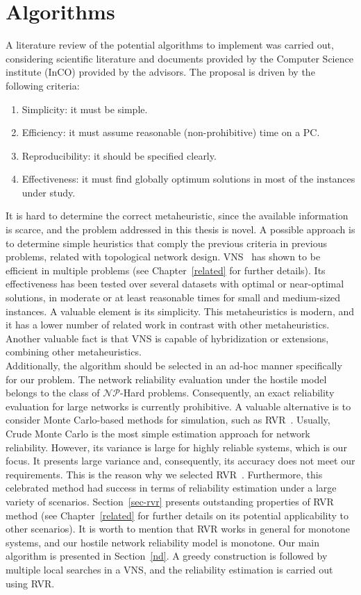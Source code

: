\chapter{Algorithms}\label{algorithms}
A literature review of the potential algorithms to implement was carried out, considering 
scientific literature and documents provided by the Computer Science institute (InCO) 
provided by the advisors. The proposal is driven by the following criteria:
\begin{enumerate}
    \item Simplicity: it must be simple.
    \item Efficiency: it must assume reasonable (non-prohibitive) time on a PC.
    \item Reproducibility: it should be specified clearly.
    \item Effectiveness: it must find globally optimum solutions in most of the instances under study.
\end{enumerate}

It is hard to determine the correct metaheuristic, since the available information is scarce, and the problem addressed in this thesis is novel. A possible approach is to determine simple heuristics 
that comply the previous criteria in previous problems, related with topological network design. 
VNS~\cite{16,17,18} has shown to be efficient in multiple problems (see Chapter~\ref{related} for further details). Its effectiveness has been tested over several datasets with 
optimal or near-optimal solutions, in moderate or at least reasonable times for small and medium-sized instances. A valuable element is its simplicity. This metaheuristics is modern, and it has a lower 
number of related work in contrast with other metaheuristics. Another valuable fact is that VNS is capable of hybridization or extensions, combining other metaheuristics.\\

Additionally, the algorithm should be selected in an ad-hoc manner specifically for our problem. 
The network reliability evaluation under the hostile model belongs to the class of $\mathcal{NP}$-Hard problems. Consequently, an exact reliability evaluation for large networks is currently prohibitive. 
A valuable alternative is to consider Monte Carlo-based methods for simulation, 
such as RVR~\cite{4,85,2,78}. 
Usually, Crude Monte Carlo is the most simple estimation approach for network reliability. 
However, its variance is large for highly reliable systems, which is our focus. It 
presents large variance and, consequently, its accuracy does not meet our requirements. 
This is the reason why we selected RVR~\cite{4,85,2,78}. Furthermore, 
this celebrated method had success in terms of reliability estimation under a large variety of 
scenarios. 
Section~\ref{sec-rvr} presents outstanding properties of RVR method (see Chapter~\ref{related} for further details on its potential applicability to other scenarios). It is worth to mention 
that RVR works in general for monotone systems, and our hostile network reliability model 
is monotone. Our main algorithm is presented in Section~\ref{nd}. A greedy construction is followed 
by multiple local searches in a VNS, and the reliability estimation is carried out using RVR.

